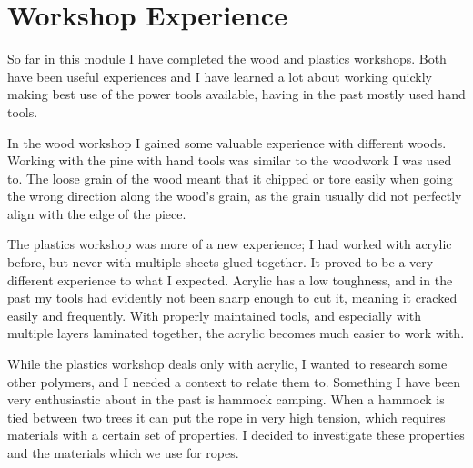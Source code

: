 \section{Workshop Experience}
So far in this module I have completed the wood and plastics workshops. Both have been useful experiences and I have learned a lot about working quickly making best use of the power tools available, having in the past mostly used hand tools.

In the wood workshop I gained some valuable experience with different woods. Working with the pine with hand tools was similar to the woodwork I was used to. The loose grain of the wood meant that it chipped or tore easily when going the wrong direction along the wood's grain, as the grain usually did not perfectly align with the edge of the piece.

The plastics workshop was more of a new experience; I had worked with acrylic before, but never with multiple sheets glued together. It proved to be a very different experience to what I expected. Acrylic has a low toughness, and in the past my tools had evidently not been sharp enough to cut it, meaning it cracked easily and frequently. With properly maintained tools, and especially with multiple layers laminated together, the acrylic becomes much easier to work with.

While the plastics workshop deals only with acrylic, I wanted to research some other polymers, and I needed a context to relate them to. Something I have been very enthusiastic about in the past is hammock camping. When a hammock is tied between two trees it can put the rope in very high tension, which requires materials with a certain set of properties. I decided to investigate these properties and the materials which we use for ropes.
